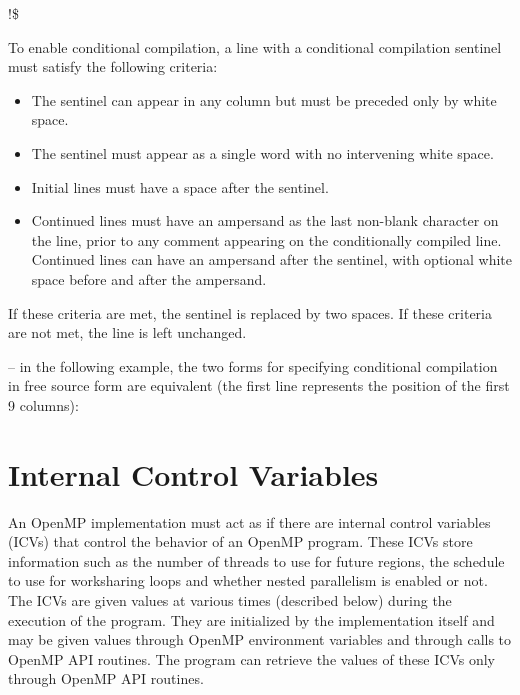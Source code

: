 \begin{boxedcode}
!\$
\end{boxedcode}

To enable conditional compilation, a line with a conditional compilation sentinel must 
satisfy the following criteria: 

\begin{itemize}
\item The sentinel can appear in any column but must be preceded only by white space.

\item The sentinel must appear as a single word with no intervening white space. 

\item Initial lines must have a space after the sentinel. 

\item Continued lines must have an ampersand as the last non-blank character on the line, 
prior to any comment appearing on the conditionally compiled line. Continued lines 
can have an ampersand after the sentinel, with optional white space before and after 
the ampersand. 
\end{itemize}

If these criteria are met, the sentinel is replaced by two spaces. If these criteria are not 
met, the line is left unchanged. 

\notestart
\noteheader – in the following example, the two forms for specifying conditional compilation 
in free source form are equivalent (the first line represents the position of the first 9 
columns):

\begin{alltt}
\end{alltt}
\noteend
\bigskip
\fortranspecificend









\section{Internal Control Variables}
\label{sec:Internal Control Variables}
An OpenMP implementation must act as if there are internal control variables (ICVs) 
that control the behavior of an OpenMP program. These ICVs store information such as 
the number of threads to use for future  regions, the schedule to use for 
worksharing loops and whether nested parallelism is enabled or not. The ICVs are given 
values at various times (described below) during the execution of the program. They are 
initialized by the implementation itself and may be given values through OpenMP 
environment variables and through calls to OpenMP API routines. The program can 
retrieve the values of these ICVs only through OpenMP API routines.

